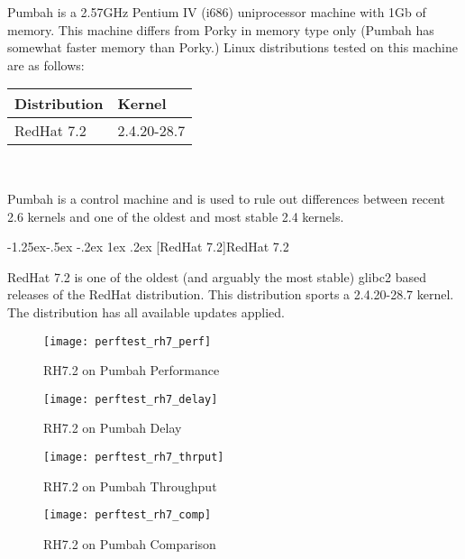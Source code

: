 \documentclass[letterpaper,final,notitlepage,twocolumn,10pt,twoside]{article}
\makeatletter
\renewcommand\subsubsection{\@startsection{subsubsection}{3}{\z@}%
                                     {-1.25ex\@plus -.5ex \@minus -.2ex}%
                                     {1ex \@plus .2ex}%
                                     {\normalfont\normalsize\bfseries}}
\makeatother
\begin{document}
Pumbah is a 2.57GHz Pentium IV (i686) uniprocessor machine with 1Gb of memory.  This machine differs
from Porky in memory type only (Pumbah has somewhat faster memory than Porky.) Linux distributions
tested on this machine are as follows:

\small
\setlength{\tabcolsep}{0.4em}
\setlength{\arraycolsep}{0.4em}
\begin{tabular}{ll}\\
Distribution & Kernel\\
\hline
RedHat 7.2 & 2.4.20-28.7\\
\end{tabular}\\[1.0ex]
\normalsize

Pumbah is a control machine and is used to rule out differences between recent 2.6 kernels and one
of the oldest and most stable 2.4 kernels.

\subsubsection[RedHat 7.2]{RedHat 7.2}

RedHat 7.2 is one of the oldest (and arguably the most stable) glibc2 based releases of the RedHat
distribution.  This distribution sports a 2.4.20-28.7 kernel.  The distribution has all available
updates applied.

\begin{figure}[p]
\texttt{[image: perftest\_rh7\_perf]}
\caption[RH7.2 on Pumbah Performance]{RH7.2 on Pumbah Performance}
\label{figure:rh7perf}
\end{figure}

\begin{figure}[p]
\texttt{[image: perftest\_rh7\_delay]}
\caption[RH7.2 on Pumbah Delay]{RH7.2 on Pumbah Delay}
\label{figure:rh7delay}
\end{figure}

\begin{figure}[p]
\texttt{[image: perftest\_rh7\_thrput]}
\caption[RH7.2 on Pumbah Throughput]{RH7.2 on Pumbah Throughput}
\label{figure:rh7thrput}
\end{figure}

\begin{figure}[pt]
\texttt{[image: perftest\_rh7\_comp]}
\caption[RH7.2 on Pumbah Comparison]{RH7.2 on Pumbah Comparison}
\label{figure:rh7comp}
\end{figure}
\end{document}
